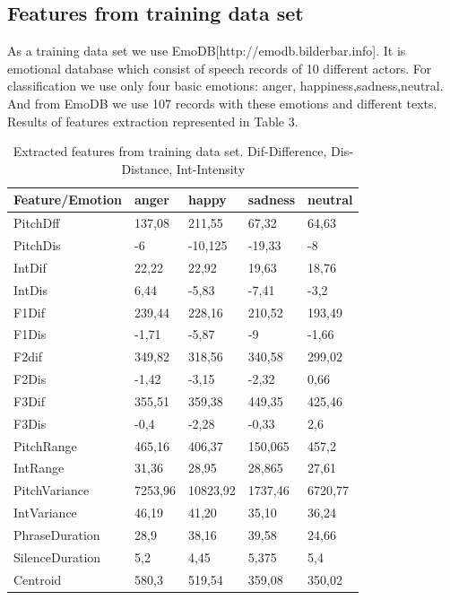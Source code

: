 \documentclass[12pt, letterpaper]{article}
\begin{document}
\subsection{Features from training data set}

As a training data set we use EmoDB[http://emodb.bilderbar.info]. It is emotional database which consist of speech records of 10 different actors. For classification we use only four basic emotions: anger, happiness,sadness,neutral. And from EmoDB we use 107 records with these emotions and different texts. Results of features extraction represented in Table 3.
\begin{table}[h]
	\centering
		\begin{tabular}{l|l|l|l|l|}
			\hline
				Feature/Emotion& anger&	happy	&sadness	&neutral\\ \hline
PitchDff&	137,08	&211,55	&67,32	&64,63\\ \hline 
PitchDis&	-6	&-10,125&	-19,33&	-8\\ \hline
IntDif&	22,22&	22,92&	19,63&	18,76\\ \hline
IntDis	&6,44	&-5,83&	-7,41&	-3,2\\ \hline
F1Dif&	239,44&	228,16&	210,52&	193,49\\ \hline
F1Dis&	-1,71	&-5,87&	-9&	-1,66\\ \hline
F2dif	&349,82&	318,56&	340,58&	299,02\\ \hline
F2Dis&	-1,42&	-3,15&	-2,32	&0,66\\ \hline
F3Dif&	355,51&	359,38&	449,35&	425,46\\ \hline
F3Dis&	-0,4	&-2,28&	-0,33&	2,6\\ \hline
PitchRange&	465,16&	406,37&	150,065&	457,2\\ \hline
IntRange&	31,36&	28,95&	28,865&	27,61\\ \hline
PitchVariance&	7253,96&	10823,92&	1737,46&	6720,77\\ \hline
IntVariance	&46,19&	41,20&	35,10	&36,24\\ \hline
PhraseDuration&	28,9&	38,16&	39,58	&24,66\\ \hline
SilenceDuration	&5,2	&4,45	&5,375&	5,4\\ \hline
Centroid&	580,3	&519,54&	359,08&	350,02\\ \hline
 \hline
		\end{tabular}
	\caption{Extracted features from training data set. Dif-Difference, Dis-Distance, Int-Intensity}
	\label{tab:ExtractedFeaturesFromTrainingDataSet}
\end{table}
\end{document}
